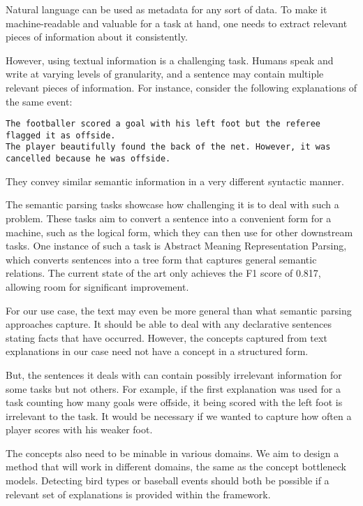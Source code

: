 Natural language can be used as metadata for any sort of data.
To make it machine-readable and valuable for a task at hand, one needs to extract relevant pieces of information about it consistently.

However, using textual information is a challenging task.
Humans speak and write at varying levels of granularity, and a sentence may contain multiple relevant pieces of information.
For instance, consider the following explanations of the same event:
\begin{lstlisting}
The footballer scored a goal with his left foot but the referee flagged it as offside.
The player beautifully found the back of the net. However, it was cancelled because he was offside.
\end{lstlisting}
They convey similar semantic information in a very different syntactic manner.

The semantic parsing tasks showcase how challenging it is to deal with such a problem.
These tasks aim to convert a sentence into a convenient form for a machine, such as the logical form, which they can then use for other downstream tasks.
One instance of such a task is Abstract Meaning Representation Parsing, which converts sentences into a tree form that captures general semantic relations.
The current state of the art only achieves the F1 score of 0.817, allowing room for significant improvement.

For our use case, the text may even be more general than what semantic parsing approaches capture.
It should be able to deal with any declarative sentences stating facts that have occurred.
However, the concepts captured from text explanations in our case need not have a concept in a structured form.

But, the sentences it deals with can contain possibly irrelevant information for some tasks but not others.
For example, if the first explanation was used for a task counting how many goals were offside, it being scored with the left foot is irrelevant to the task.
It would be necessary if we wanted to capture how often a player scores with his weaker foot.

The concepts also need to be minable in various domains.
We aim to design a method that will work in different domains, the same as the concept bottleneck models.
Detecting bird types or baseball events should both be possible if a relevant set of explanations is provided within the framework.

